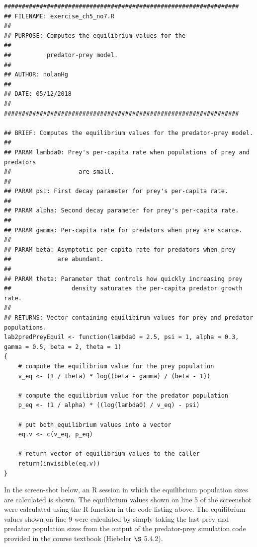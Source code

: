 \documentclass[11pt]{article}
\begin{document}
\begin{lstlisting}
##################################################################
## FILENAME: exercise_ch5_no7.R                                        ##
## PURPOSE: Computes the equilibrium values for the                    ##
##          predator-prey model.     	                                ##
## AUTHOR: nolanHg                                                     ##
## DATE: 05/12/2018                                                    ##  
##################################################################

## BRIEF: Computes the equilibrium values for the predator-prey model.
##
## PARAM lambda0: Prey's per-capita rate when populations of prey and predators 
##	                 are small.
##
## PARAM psi: First decay parameter for prey's per-capita rate.
##
## PARAM alpha: Second decay parameter for prey's per-capita rate.
##
## PARAM gamma: Per-capita rate for predators when prey are scarce.
##
## PARAM beta: Asymptotic per-capita rate for predators when prey 
## 	           are abundant.
##
## PARAM theta: Parameter that controls how quickly increasing prey
##	               density saturates the per-capita predator growth rate.
##
## RETURNS: Vector containing equilibirum values for prey and predator populations.
lab2predPreyEquil <- function(lambda0 = 2.5, psi = 1, alpha = 0.3, gamma = 0.5, beta = 2, theta = 1)
{
	# compute the equilibrium value for the prey population
	v_eq <- (1 / theta) * log((beta - gamma) / (beta - 1))

	# compute the equilibrium value for the predator population
	p_eq <- (1 / alpha) * ((log(lambda0) / v_eq) - psi)
	
	# put both equilibrium values into a vector	
	eq.v <- c(v_eq, p_eq)
	
	# return vector of equilibrium values to the caller	
	return(invisible(eq.v))
}
\end{lstlisting}

\noindent In the screen-shot below, an R session in which the equilibrium population sizes are calculated is shown. The equilibrium values shown on line 5 of the screenshot were calculated using the R function in the code listing above.  The equilibrium values shown on line 9 were calculated by simply taking the last prey and predator population sizes from the output of the predator-prey simulation code provided in the course textbook (Hiebeler $\S$ 5.4.2).

\vspace{3mm}
\end{document}
